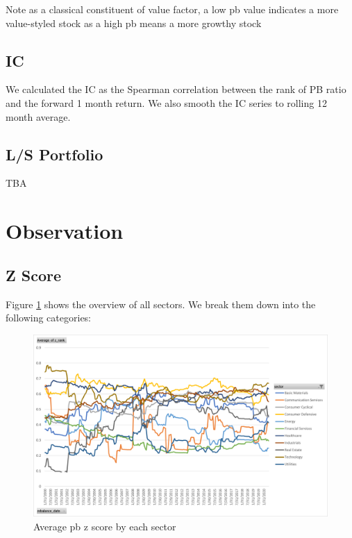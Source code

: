 \documentclass[11pt]{article} %
\begin{document}
Note as a classical constituent of value factor, a low pb value indicates a more value-styled stock as a high pb means a more growthy stock

\subsection{IC}
We calculated the IC as the Spearman correlation between the rank of PB ratio and the forward 1 month return. We also smooth the IC series to rolling 12 month average.


\subsection{L/S Portfolio}
TBA

\section{Observation}
\subsection{Z Score}
Figure \ref{fig:pb_z_sector} shows the overview of all sectors. We break them down into the following categories:

\begin{figure}[H]
\centering
\includegraphics[scale=0.7]{pb_z_score_sector.png}
\caption{Average pb z score by each sector}
\label{fig:pb_z_sector}
\end{figure}
\end{document}
